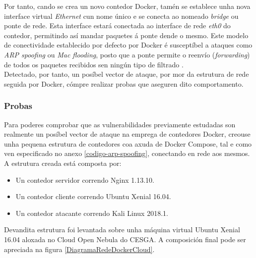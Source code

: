 Por tanto, cando se crea un novo contedor Docker, tamén se establece unha nova interface virtual \textit{Ethernet} cun nome único e se conecta ao nomeado \textit{bridge} ou ponte de rede. Esta interface estará conectada ao interface de rede \textit{eth0} do contedor, permitindo así mandar paquetes á ponte dende o mesmo. Este modelo de conectividade establecido por defecto por Docker é susceptíbel a ataques como \textit{ARP spoofing} ou \textit{Mac flooding}, posto que a ponte permite o reenvío (\textit{forwarding}) de todos os paquetes recibidos sen ningún tipo de filtrado \cite{Securing-Docker-Containers-from-Denial-of-Service}.\\

Detectado, por tanto, un posíbel vector de ataque, por mor da estrutura de rede seguida por Docker, cómpre realizar probas que aseguren dito comportamento.


\subsubsection{Probas}

Para poderes comprobar que as vulnerabilidades previamente estudadas son realmente un posíbel vector de ataque na emprega de contedores Docker, creouse unha pequena estrutura de contedores coa axuda de Docker Compose, tal e como ven especificado no anexo \ref{codigo-arp-spoofing}, conectando en rede aos mesmos. A estrutura creada está composta por:

\begin{itemize}
    \item Un contedor servidor correndo Nginx 1.13.10.
    \item Un contedor cliente correndo Ubuntu Xenial 16.04.
    \item Un contedor atacante correndo Kali Linux 2018.1.
\end{itemize}

Devandita estrutura foi levantada sobre unha máquina virtual Ubuntu Xenial 16.04 aloxada no Cloud Open Nebula do CESGA. A composición final pode ser apreciada na figura \ref{DiagramaRedeDockerCloud}.\\

